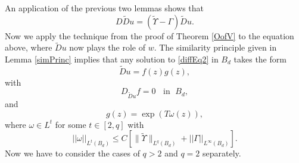 \documentclass[12pt,reqno]{amsart}
\theoremstyle{plain}
\theoremstyle{definition}
\newcommand{\Ga}{\Gamma}
\newcommand{\om}{\omega}
\newcommand{\iny}{\infty}
\newcommand{\norm}[1]{\left\vert \left\vert #1\right\vert\right\vert}
\newcommand{\brac}[1]{\left[#1\right]}
\newcommand{\pr}[1]{\left( #1 \right) }
\begin{document}
An application of the previous two lemmas shows that
\begin{equation}
D \widetilde D u = \pr{ \widetilde \Upsilon - \Ga} \widetilde D u.
\label{diffEq2}
\end{equation}
Now we apply the technique from the proof of Theorem \ref{OofV} to the equation above, where $\widetilde D u$ now plays the role of $w$.
The similarity principle given in Lemma \ref{simPrinc} implies that any solution to \eqref{diffEq2} in $B_d$ takes the form
$$\widetilde D u = f\pr{z} g\pr{z},$$
with
$$D_{\widetilde D u} f = 0 \;\; \text{ in } \; B_d,$$
and 
$$g\pr{z} = \exp\pr{T \om\pr{z}},$$
where 
$\om \in L^t$ for some $t \in \brac{2, q}$ with 
$$\norm{\om}_{L^t\pr{B_d}} \le C\brac{\|\widetilde \Upsilon\|_{L^q\pr{B_d}} +  \norm{\Ga}_{L^{\iny}\pr{B_d}}}.$$
Now we have to consider the cases of $q > 2$ and $q = 2$ separately.
\end{document}
